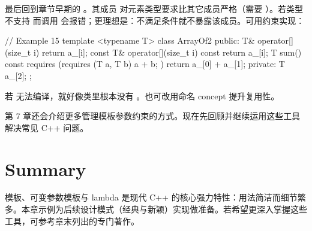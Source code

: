 最后回到章节早期的 。其成员  对元素类型要求比其它成员严格（需要 \cii{+}）。若类型不支持 \cii{+} 而调用  会报错；更理想是：不满足条件就不暴露该成员。可用约束实现：

\begin{code}
// Example 15
template <typename T> class ArrayOf2 {
  public:
  T& operator[](size_t i) { return a_[i]; }
  const T& operator[](size_t i) const { return a_[i]; }
  T sum() const requires (requires (T a, T b) { a + b; }) {
    return a_[0] + a_[1];
  }
  private:
  T a_[2];
};
\end{code}

若  无法编译，就好像类里根本没有 。也可改用命名 concept 提升复用性。

第 7 章还会介绍更多管理模板参数约束的方式。现在先回顾并继续运用这些工具解决常见 C++ 问题。

\section{Summary}

模板、可变参数模板与 lambda 是现代 C++ 的核心强力特性：用法简洁而细节繁多。本章示例为后续设计模式（经典与新颖）实现做准备。若希望更深入掌握这些工具，可参考章末列出的专门著作。

